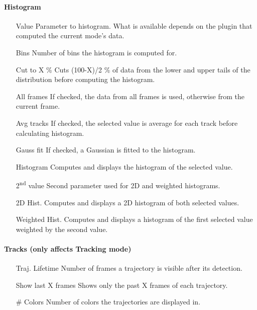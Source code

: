 \documentclass[11pt,onside]{report}
\numberwithin{equation}{chapter}
\begin{document}
\paragraph{Histogram}
\begin{itemize}[leftmargin=3cm]
\item[\textsf{Value}] Parameter to histogram. What is available depends on the plugin that computed the current mode's data.
\item[\textsf{Bins}] Number of bins the histogram is computed for.
\item[\textsf{Cut to X \%}] Cuts (100-X)/2 \% of data from the lower and upper tails of the distribution before computing the histogram. 
\item[\textsf{All frames}] If checked, the data from all frames is used, otherwise from the current frame.
\item[\textsf{Avg tracks}] If checked, the selected value is average for each track before calculating histogram.
\item[\textsf{Gauss fit}] If checked, a Gaussian is fitted to the histogram.
\item[\textsf{Histogram}] Computes and displays the histogram of the selected value.
\item[\textsf{2\textsuperscript{nd} value}] Second parameter used for 2D and weighted histograms.
\item[2D Hist.] Computes and displays a 2D histogram of both selected values.
\item[Weighted Hist.] Computes and displays a histogram of the first selected value weighted by the second value.
\end{itemize}

\paragraph{Tracks (only affects \textsf{Tracking} mode)}
\begin{itemize}[leftmargin=3.5cm]
\item[\textsf{Traj. Lifetime}] Number of frames a trajectory is visible after its detection.
\item[\textsf{Show last X frames}] Shows only the past X frames of each trajectory.
\item[\textsf{\# Colors}] Number of colors the trajectories are displayed in. 
\end{itemize}
\end{document}
